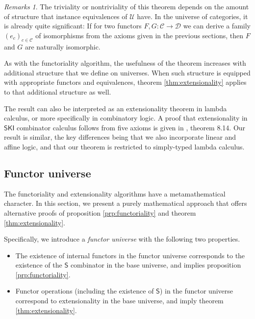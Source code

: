 \documentclass[a4paper]{article}
\theoremstyle{definition}
\theoremstyle{remark}
\newtheorem*{remarks}{Remarks}
\newcommand{\defn}{\emph}
\newcommand{\C}{\mathcal{C}}
\newcommand{\D}{\mathcal{D}}
\newcommand{\U}{\mathcal{U}}
\newcommand{\nm}{\mathsf}
\newcommand{\combinator}{\nm}
\newcommand{\revSubstFun}{\combinator{S}}
\begin{document}
\begin{remarks}
  The triviality or nontriviality of this theorem depends on the amount of structure
  that instance equivalences of $\U$ have. In the universe of categories, it is
  already quite significant: If for two functors $F,G : \C \to \D$ we can derive a
  family $(e_c)_{c \in \C}$ of isomorphisms from the axioms given in the previous
  sections, then $F$ and $G$ are naturally isomorphic.

  As with the functoriality algorithm, the usefulness of the theorem increases with
  additional structure that we define on universes. When such structure is equipped
  with appropriate functors and equivalences, theorem \ref{thm:extensionality}
  applies to that additional structure as well.

  The result can also be interpreted as an extensionality theorem in lambda calculus,
  or more specifically in combinatory logic. A proof that extensionality in $\nm{SKI}$
  combinator calculus follows from five axioms is given in \cite{hindley-seldin},
  theorem 8.14. Our result is similar, the key differences being that we also
  incorporate linear and affine logic, and that our theorem is restricted to
  simply-typed lambda calculus.
\end{remarks}

\subsection{Functor universe}
\label{sec:functor-universe}

The functoriality and extensionality algorithms have a metamathematical character. In
this section, we present a purely mathematical approach that offers alternative proofs of
proposition \ref{prp:functoriality} and theorem \ref{thm:extensionality}.

Specifically, we introduce a \defn{functor universe} with the following two properties.
\begin{itemize}
  \item The existence of internal functors in the functor universe corresponds to the
  existence of the $\revSubstFun$ combinator in the base universe, and implies
  proposition \ref{prp:functoriality}.
  \item Functor operations (including the existence of $\revSubstFun$) in the functor
  universe correspond to extensionality in the base universe, and imply theorem
  \ref{thm:extensionality}.
\end{itemize}
\end{document}
